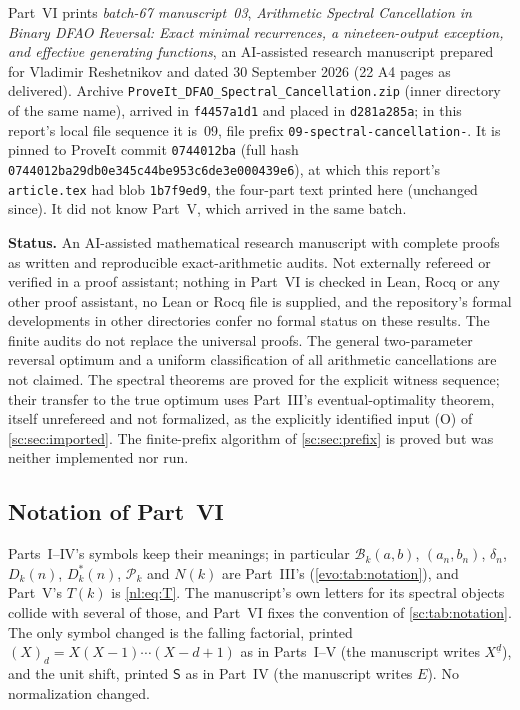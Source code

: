 \documentclass[11pt,a4paper]{article}
\numberwithin{equation}{section}
\theoremstyle{definition}
\theoremstyle{remark}
\newcommand{\fall}[2]{(#1)_{#2}}
\newcommand{\Bip}{\mathcal B}
\begin{document}
Part~VI prints \emph{batch-67 manuscript~03}, \emph{Arithmetic Spectral
Cancellation in Binary DFAO Reversal: Exact minimal recurrences, a
nineteen-output exception, and effective generating functions}, an
AI-assisted research manuscript prepared for Vladimir Reshetnikov and dated
30 September 2026 (22 A4 pages as delivered). Archive
\texttt{ProveIt\_\allowbreak DFAO\_\allowbreak Spectral\_\allowbreak Cancellation.zip}
(inner directory of the same name), arrived in \texttt{f4457a1d1} and
placed in \texttt{d281a285a}; in this report's local file sequence it
is~09, file prefix \texttt{09-spectral-cancellation-}. It is pinned to
ProveIt commit \texttt{0744012ba} (full hash
\texttt{0744012ba29db0e345c44be953c6de3e000439e6}), at which this report's
\texttt{article.tex} had blob \texttt{1b7f9ed9}, the four-part text printed
here (unchanged since). It did not know Part~V, which arrived in the same
batch.

\begin{resultbox}
\textbf{Status.} An AI-assisted mathematical research manuscript with
complete proofs as written and reproducible exact-arithmetic audits. Not
externally refereed or verified in a proof assistant; nothing in Part~VI is
checked in Lean, Rocq or any other proof assistant, no Lean or Rocq file is
supplied, and the repository's formal developments in other directories
confer no formal status on these results. The finite audits do not replace
the universal proofs. The general two-parameter reversal optimum and a
uniform classification of all arithmetic cancellations are not claimed. The
spectral theorems are proved for the explicit witness sequence; their
transfer to the true optimum uses Part~III's eventual-optimality theorem,
itself unrefereed and not formalized, as the explicitly identified input
(O) of \cref{sc:sec:imported}. The finite-prefix algorithm of
\cref{sc:sec:prefix} is proved but was neither implemented nor run.
\end{resultbox}

\subsection{Notation of Part~VI}\label{sc:sec:notation}

Parts~I--IV's symbols keep their meanings; in particular $\Bip_k(a,b)$,
$(a_n,b_n)$, $\delta_n$, $D_k(n)$, $D^*_k(n)$, $\mathcal P_k$ and $N(k)$ are
Part~III's (\cref{evo:tab:notation}), and Part~V's $T(k)$ is
\eqref{nl:eq:T}. The manuscript's own letters for its spectral objects
collide with several of those, and Part~VI fixes the convention of
\cref{sc:tab:notation}. The only symbol changed is the falling factorial,
printed $\fall{X}{d}=X(X-1)\cdots(X-d+1)$ as in Parts~I--V (the manuscript
writes $X^{\underline d}$), and the unit shift, printed $\mathsf S$ as in
Part~IV (the manuscript writes $E$). No normalization changed.
\end{document}
